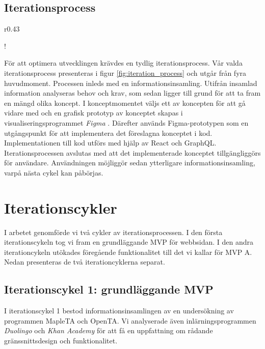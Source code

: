 \subsection{Iterationsprocess}

\begin{wrapfigure}{r}{0.43\textwidth}
  \begin{center}
    \resizebox {0.4\textwidth} {!} {
        
    }
    \caption{Iterationsprocess för produkt-  och webbutveckling. Figuren visar de huvudsakliga stegen och kopplingarna däremellan.}
    \label{fig:iteration_process}
  \end{center}
\end{wrapfigure}

För att optimera utvecklingen krävdes en tydlig iterationsprocess. Vår valda iterationsprocess presenteras i figur \ref{fig:iteration_process} och utgår från fyra huvudmoment. Processen inleds med en informationsinsamling. Utifrån insamlad information analyseras behov och krav, som sedan ligger till grund för att ta fram en mängd olika koncept. I konceptmomentet väljs ett av koncepten för att gå vidare med och en grafisk prototyp av konceptet skapas i visualiseringsprogrammet \emph{Figma} \cite{figma}. Därefter används Figma-prototypen som en utgångspunkt för att implementera det föreslagna konceptet i kod. Implementationen till kod utförs med hjälp av React och GraphQL. Iterationsprocessen avslutas med att det implementerade konceptet tillgängliggörs för användare. Användningen möjliggör sedan ytterligare informationsinsamling, varpå nästa cykel kan påbörjas. 


\section{Iterationscykler}

I arbetet genomförde vi två cykler av iterationsprocessen. I den första iterationscykeln tog vi fram en grundläggande MVP för webbsidan. I den andra iterationcykeln utökades föregående funktionalitet till det vi kallar för MVP A. Nedan presenteras de två iterationcyklerna separat.

\subsection{Iterationscykel 1: grundläggande MVP}
I iterationscykel 1 bestod informationsinsamlingen av en undersökning av programmen MapleTA och OpenTA. Vi analyserade även inlärningsprogrammen \emph{Duolingo} \cite{duolingo} och \emph{Khan Academy} \cite{khanacademy} för att få en uppfattning om rådande gränssnittsdesign och funktionalitet.

